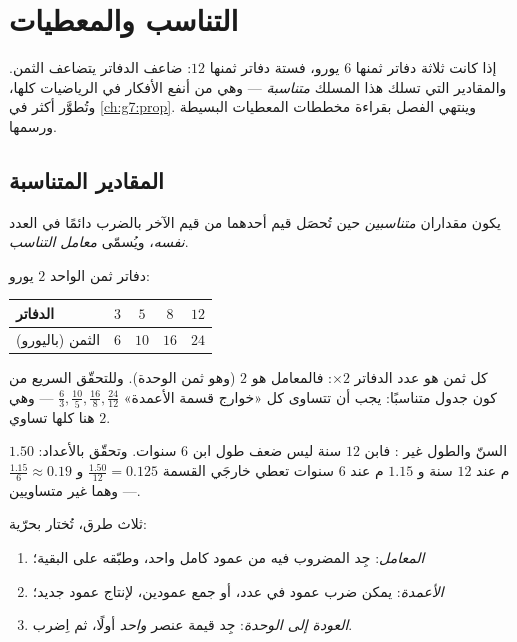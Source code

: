 \chapter{التناسب والمعطيات}\label{ch:g6:propdata}

إذا كانت ثلاثة دفاتر ثمنها $6$ يورو، فستة دفاتر ثمنها $12$: ضاعف
الدفاتر يتضاعف الثمن. والمقادير التي تسلك هذا المسلك
\emph{متناسبة} --- وهي من أنفع الأفكار في الرياضيات
كلها، وتُطوَّر أكثر في \cref{ch:g7:prop}. وينتهي الفصل
بقراءة مخططات المعطيات البسيطة ورسمها.

\section{المقادير المتناسبة}

\begin{definition}[التناسب]\label{def:g6:propdata:def}
يكون مقداران \emph{متناسبين} حين
تُحصَل قيم أحدهما من قيم الآخر بالضرب
دائمًا في العدد \emph{نفسه}، ويُسمّى \emph{معامل
التناسب}.
\end{definition}

\begin{example}\label{ex:g6:propdata:table}
دفاتر ثمن الواحد $2$ يورو:
\begin{center}
\renewcommand{\arraystretch}{1.3}
\begin{tabular}{l|cccc}
الدفاتر & $3$ & $5$ & $8$ & $12$ \\
\hline
الثمن (باليورو) & $6$ & $10$ & $16$ & $24$ \\
\end{tabular}
\end{center}
كل ثمن هو عدد الدفاتر $\times 2$: فالمعامل هو
$2$ (وهو ثمن الوحدة). وللتحقّق السريع من كون جدول متناسبًا:
يجب أن تتساوى كل «خوارج قسمة الأعمدة» $\frac{6}{3}, \frac{10}{5}, \frac{16}{8},
\frac{24}{12}$ --- وهي هنا كلها تساوي $2$.
\end{example}

\begin{example}\label{ex:g6:propdata:nonexample}
السنّ والطول غير : فابن $12$ سنة ليس ضعف طول
ابن $6$ سنوات. وتحقّق بالأعداد: $1.50$ م عند $12$ سنة و
$1.15$ م عند $6$ سنوات تعطي خارجَي القسمة $\frac{1.50}{12} = 0.125$ و
$\frac{1.15}{6} \approx 0.19$ --- وهما غير متساويين.
\end{example}

\begin{method}\label{met:g6:propdata:complete}
ثلاث طرق، تُختار بحرّية:
\begin{enumerate}
  \item \emph{المعامل}: جِد المضروب فيه من عمود كامل
        واحد، وطبّقه على البقية؛
  \item \emph{الأعمدة}: يمكن ضرب عمود في عدد، أو جمع
        عمودين، لإنتاج عمود جديد؛
  \item \emph{العودة إلى الوحدة}: جِد قيمة عنصر \emph{واحد}
        أولًا، ثم اِضرب.
\end{enumerate}
\end{method}

